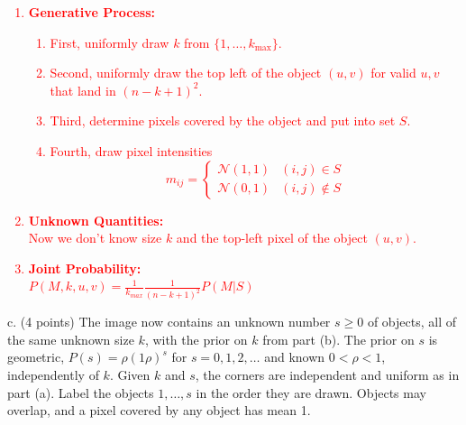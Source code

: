 \documentclass[11pt]{article}
\begin{document}
\textcolor{red}{
\begin{enumerate}
    \item \textbf{Generative Process:}\\
        \begin{enumerate}
            \item 
                First, uniformly draw $k$ from $\{1,\ldots,k_{\max}\}$.
            \item 
                Second, uniformly draw the top left of the object $(u,v)$ for valid $u,v$ that land in $(n-k+1)^2$.
            \item 
                Third, determine pixels covered by the object and put into set $S$.
            \item 
                Fourth, draw pixel intensities
                \[
                m_{ij} = 
                \begin{cases} 
                      \mathcal N(1,1) & (i,j) \in S \\
                      \mathcal N(0,1) & (i,j) \notin S 
                \end{cases}
                \]
        \end{enumerate}
    \item \textbf{Unknown Quantities:}\\
        Now we don't know size $k$ and the top-left pixel of the object $(u,v)$.
    \item \textbf{Joint Probability:}\\
        $P(M, k, u, v) = \frac{1}{k_{max}} \frac{1}{(n-k+1)^2} P(M|S)$
\end{enumerate}
}

c. (4 points) The image now contains an unknown number $s\ge0$ of objects, all of the same unknown size $k$, with the prior on $k$ from part (b).  The prior on $s$ is geometric, $P(s)=\rho(1 \rho)^s$ for $s=0,1,2,\ldots$ and known $0<\rho<1$, independently of $k$.  Given $k$ and $s$, the corners are independent and uniform as in part (a).  Label the objects $1,\ldots,s$ in the order they are drawn.  Objects may overlap, and a pixel covered by any object has mean 1.
\end{document}
